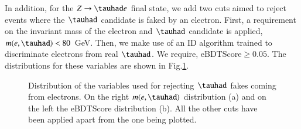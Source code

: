 In addition, for the $Z\to\tauhad e$ final state, we add two cuts aimed to reject events where the $\tauhad$ candidate is faked by an electron. First, a requirement on the invariant mass of the electron and $\tauhad$ candidate is applied, $m(e,\tauhad)<80$ GeV. Then, we make use of an ID algorithm trained to discriminate electrons from real $\tauhad$. We require, eBDTScore$\geq 0.05$. The distributions for these variables are shown in Fig.\ref{Fig5}.
\begin{figure}[htbp]
	\centering
	\hfill
	\caption{Distribution of the variables used for rejecting $\tauhad$ fakes coming from electrons. On the right $m(e,\tauhad)$ distribution (a) and on the left the eBDTScore distribution (b). All the other cuts have been applied apart from the one being plotted.}
	\label{Fig5}
\end{figure}

